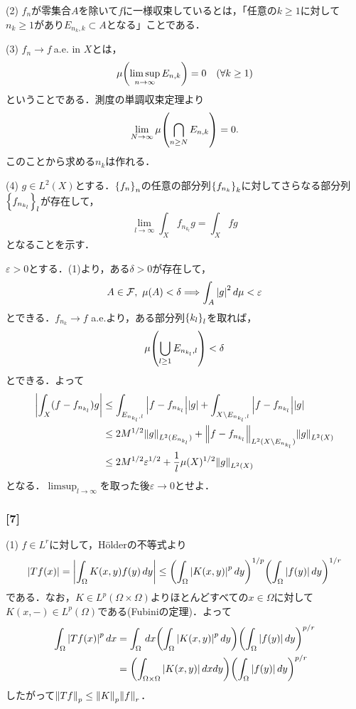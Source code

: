 \documentclass[a4j]{ltjsarticle}
\newcommand{\1}{\mathbbm{1}}
\numberwithin{equation}{section}
\theoremstyle{definition}
\begin{document}
(2) $f_n$が零集合$A$を除いて$f$に一様収束しているとは，「任意の$k\geq 1$に対して$n_k\geq 1$があり$E_{n_k,k}\subset A$となる」ことである．

(3) $f_n\to f\ $a.e. in $X$とは，
\begin{equation}
    \mu\qty(\limsup_{n\to\infty}E_{n,k})=0\quad (\forall k\geq 1)
\end{equation}
ということである．測度の単調収束定理より
\begin{equation}
    \lim_{N\to\infty}\mu\qty(\bigcap_{n\geq N}E_{n,k})=0.
\end{equation}
このことから求める$n_k$は作れる．

(4) $g\in L^2(X)$とする．$\qty{f_n}_n$の任意の部分列$\qty{f_{n_k}}_k$に対してさらなる部分列$\qty{f_{n_{k_l}}}_l$が存在して，
\begin{equation}
    \lim_{l\to\infty}\int_{X}f_{n_{k_l}}g=\int_{X}fg 
\end{equation}
となることを示す．

$\varepsilon>0$とする．(1)より，ある$\delta>0$が存在して，
\begin{equation}
    A\in \mathcal{F},\ \mu(A)<\delta\Longrightarrow \int_{A}\abs{g}^2\,d\mu<\varepsilon
\end{equation}
とできる．$f_{n_k}\to f$ a.e.より，ある部分列$\qty{k_l}_l$を取れば，
\begin{equation}
    \mu\qty(\bigcup_{l\geq1}E_{n_{k_l},l})<\delta 
\end{equation}
とできる．よって
\begin{align}
    \abs{\int_{X}(f-f_{n_{k_l}})g}&\leq \int_{E_{n_{k_l},l}}\abs{f-f_{n_{k_l}}}\abs{g}+\int_{X\setminus E_{n_{k_{l}},l}}\abs{f-f_{n_{k_l}}}\abs{g}\\
    &\leq 2M^{1/2}\norm{g}_{L^2(E_{n_{k_l}})}+\norm{f-f_{n_{k_{l}}}}_{L^2(X\setminus E_{n_{k_{l}}})}\norm{g}_{L^2(X)}\\
    &\leq 2M^{1/2}\varepsilon^{1/2}+\frac{1}{l}\mu(X)^{1/2}\norm{g}_{L^2(X)}
\end{align}
となる．$\limsup_{l\to\infty}$を取った後$\varepsilon\to0$とせよ．

\subsubsection*{[7]}
(1) $f\in L^r$に対して，Hölderの不等式より
\begin{equation}
    \abs{Tf(x)}=\abs{\int_{\Omega}K(x,y)f(y)\,dy}\leq \qty(\int_{\Omega}\abs{K(x,y)}^p\,dy)^{1/p}\qty(\int_{\Omega}\abs{f(y)}\,dy)^{1/r}
\end{equation}
である．なお，$K\in L^p(\Omega\times \Omega)$よりほとんどすべての$x\in \Omega$に対して$K(x,-)\in L^p(\Omega)$である(Fubiniの定理)．よって
\begin{align}
    \int_{\Omega}\abs{Tf(x)}^p\,dx&=\int_{\Omega}\,dx \qty(\int_{\Omega}\abs{K(x,y)}^p\,dy)\qty(\int_{\Omega}\abs{f(y)}\,dy)^{p/r}\\
    &=\qty(\int_{\Omega\times \Omega}\abs{K(x,y)}\,dxdy)\qty(\int_{\Omega}\abs{f(y)}\,dy)^{p/r}
\end{align}
したがって$\norm{Tf}_{p}\leq \norm{K}_p\norm{f}_r$．
\end{document}
